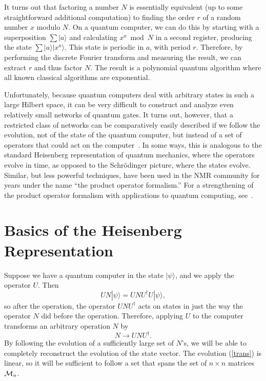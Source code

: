 It turns out that factoring a number $N$ is essentially equivalent (up
to some straightforward additional computation) to finding the order
$r$ of a random number $x$ modulo $N$.  On a quantum computer, we can
do this by starting with a superposition $\sum |a\rangle$ and
calculating $x^a \bmod N$ in a second register, producing the state
$\sum |a\rangle |x^a\rangle$.  This state is periodic in $a$, with
period $r$.  Therefore, by performing the discrete Fourier transform
and measuring the result, we can extract $r$ and thus factor $N$.  The
result is a polynomial quantum algorithm where all known classical
algorithms are exponential.

Unfortunately, because quantum computers deal with arbitrary states in
such a large Hilbert space, it can be very difficult to construct and
analyze even relatively small networks of quantum gates.  It turns
out, however, that a restricted class of networks can be comparatively
easily described if we follow the evolution, not of the state of the
quantum computer, but instead of a set of operators that could act on
the computer~\cite{gottesman:FT}.  In some ways, this is analogous to
the standard Heisenberg representation of quantum mechanics, where the
operators evolve in time, as opposed to the Schr\"odinger picture, where
the states evolve.  Similar, but less powerful techniques, have been
used in the NMR community for years under the name ``the product
operator formalism.''  For a strengthening of the product operator
formalism with applications to quantum computing, see~\cite{prodop}.

\section{Basics of the Heisenberg Representation}

Suppose we have a quantum computer in the state $|\psi\rangle$, and we
apply the operator $U$.  Then 
\begin{equation}
U N |\psi\rangle = U N U^\dagger U |\psi\rangle,
\end{equation}
so after the operation, the operator $U N U^\dagger$ acts on states in
just the way the operator $N$ did before the operation.  Therefore,
applying $U$ to the computer transforms an arbitrary operation $N$ by
\begin{equation}
N \rightarrow U N U^\dagger.
\label{trans}
\end{equation}
By following the evolution of a sufficiently large set of $N$'s, we
will be able to completely reconstruct the evolution of the state
vector.  The evolution (\ref{trans}) is linear, so it will be
sufficient to follow a set that spans the set of $n \times n$ matrices
${\cal M}_n$.  


